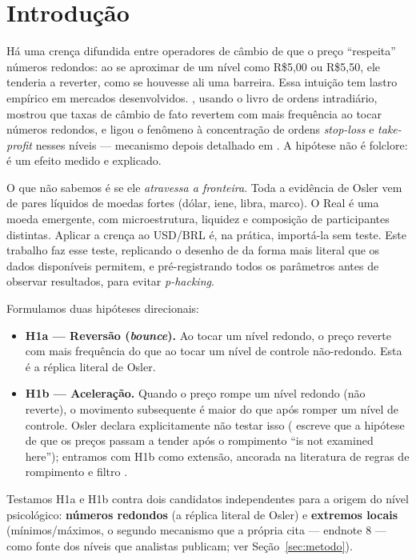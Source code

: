 \documentclass[11pt,a4paper]{article}
\begin{document}
\section{Introdução}

Há uma crença difundida entre operadores de câmbio de que o preço ``respeita'' números
redondos: ao se aproximar de um nível como R\$5,00 ou R\$5,50, ele tenderia a reverter, como
se houvesse ali uma barreira. Essa intuição tem lastro empírico em mercados desenvolvidos.
\citet{osler2000}, usando o livro de ordens intradiário, mostrou que taxas de câmbio de fato
revertem com mais frequência ao tocar números redondos, e ligou o fenômeno à concentração de
ordens \emph{stop-loss} e \emph{take-profit} nesses níveis --- mecanismo depois detalhado em
\citet{osler2003}. A hipótese não é folclore: é um efeito medido e explicado.

O que não sabemos é se ele \emph{atravessa a fronteira}. Toda a evidência de Osler vem de
pares líquidos de moedas fortes (dólar, iene, libra, marco). O Real é uma moeda emergente,
com microestrutura, liquidez e composição de participantes distintas. Aplicar a crença ao
USD/BRL é, na prática, importá-la sem teste. Este trabalho faz esse teste, replicando o
desenho de \citet{osler2000} da forma mais literal que os dados disponíveis permitem, e
pré-registrando todos os parâmetros antes de observar resultados, para evitar
\emph{p-hacking}.

Formulamos duas hipóteses direcionais:
\begin{itemize}
  \item \textbf{H1a --- Reversão (\emph{bounce}).} Ao tocar um nível redondo, o preço reverte
  com mais frequência do que ao tocar um nível de controle não-redondo. Esta é a réplica
  literal de Osler.
  \item \textbf{H1b --- Aceleração.} Quando o preço rompe um nível redondo (não reverte), o
  movimento subsequente é maior do que após romper um nível de controle. Osler declara
  explicitamente não testar isso (\citeauthor{osler2000} escreve que a hipótese de que os
  preços passam a tender após o rompimento ``is not examined here''); entramos com H1b como
  extensão, ancorada na literatura de regras de rompimento e filtro
  \citep{alexander1961,brock1992,curcio1997}.
\end{itemize}

Testamos H1a e H1b contra dois candidatos independentes para a origem do nível psicológico:
\textbf{números redondos} (a réplica literal de Osler) e \textbf{extremos locais}
(mínimos/máximos, o segundo mecanismo que a própria \citet{osler2000} cita --- endnote 8 ---
como fonte dos níveis que analistas publicam; ver Seção~\ref{sec:metodo}).
\end{document}
